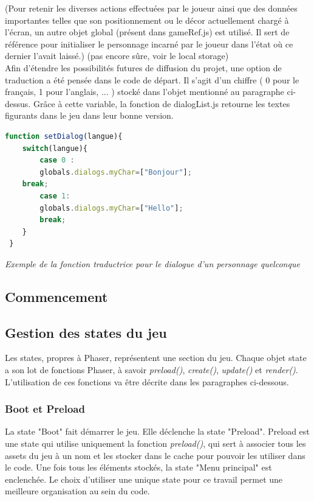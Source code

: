 \documentclass[11pt]{article}
\begin{document}
	
	(Pour retenir les diverses actions effectuées par le joueur ainsi que des données importantes telles que son positionnement ou le décor actuellement chargé à l'écran, un autre objet global (présent dans gameRef.js) est utilisé. Il sert de référence pour initialiser le personnage incarné par le joueur dans l'état où ce dernier l'avait laissé.) (pas encore sûre, voir le local storage)\\
 
 Afin d'étendre les possibilités futures de diffusion du projet, une option de traduction a été pensée dans le code de départ. Il s'agit d'un chiffre ( 0 pour le français, 1 pour l'anglais, ... ) stocké dans l'objet mentionné au paragraphe ci-dessus. Grâce à cette variable, la fonction de dialogList.js retourne les textes figurants dans le jeu dans leur bonne version. \\
 \begin{lstlisting}[language=JavaScript]
 function setDialog(langue){
    switch(langue){
        case 0 : 
        globals.dialogs.myChar=["Bonjour"];
    break;
        case 1:
        globals.dialogs.myChar=["Hello"];
		break;
 	}
 }
\end{lstlisting}
\textit{Exemple de la fonction traductrice pour le dialogue d'un personnage quelconque}
\subsection{Commencement}
\subsection{Gestion des states du jeu}
Les states, propres à Phaser, représentent une section du jeu. Chaque objet state a son lot de fonctions Phaser, à savoir \textit{preload()}, \textit{create()}, \textit{update()} et \textit{render()}. L'utilisation de ces fonctions va être décrite dans les paragraphes ci-dessous.

\subsubsection{Boot et Preload}
La state "Boot" fait démarrer le jeu. Elle déclenche la state "Preload". Preload est une state qui utilise uniquement la fonction \textit{preload()}, qui sert à associer tous les assets du jeu à un nom et les stocker dans le cache pour pouvoir les utiliser dans le code. Une fois tous les éléments stockés, la state "Menu principal" est enclenchée. Le choix d'utiliser une unique state pour ce travail permet une meilleure organisation au sein du code.
\end{document}
